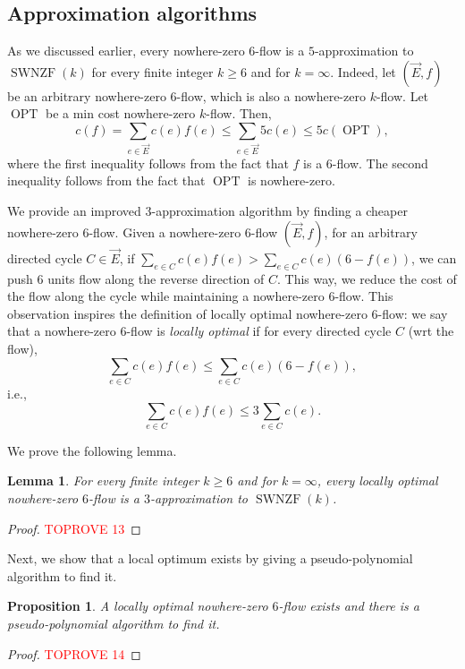 \documentclass[11pt]{article}
\newtheorem{lemma}[theorem]{Lemma}
\newtheorem{prop}[theorem]{Proposition}
\DeclareMathOperator{\opt}{OPT}
\begin{document}
\subsection{Approximation algorithms}\label{sec:SWNZF-approx}
As we discussed earlier, every nowhere-zero $6$-flow is a $5$-approximation to $\operatorname{SWNZF}(k)$ for every finite integer $k\geq 6$ and for $k=\infty$.  Indeed, let $(\vec{E},f)$ be an arbitrary nowhere-zero $6$-flow, which is also a nowhere-zero $k$-flow. Let $\opt$ be a min cost nowhere-zero $k$-flow. Then,
\[
c(f)=\sum_{e\in\vec{E}} c(e)f(e)\leq \sum_{e\in\vec{E}} 5c(e)\leq 5c(\opt),
\]
where the first inequality follows from the fact that $f$ is a $6$-flow. The second inequality follows from the fact that $\opt$ is nowhere-zero.

We provide an improved $3$-approximation algorithm by finding a cheaper nowhere-zero $6$-flow. Given a nowhere-zero $6$-flow $(\vec{E},f)$, for an arbitrary directed cycle $C\in\vec{E}$, if $\sum_{e\in C} c(e)f(e)>\sum_{e\in C} c(e)(6-f(e))$, we can push $6$ units flow along the reverse direction of $C$. This way, we reduce the cost of the flow along the cycle while maintaining a nowhere-zero $6$-flow. This observation inspires the definition of locally optimal nowhere-zero $6$-flow: we say that a nowhere-zero $6$-flow is \emph{locally optimal} if for every directed cycle $C$ (wrt the flow),
\[
    \sum_{e\in C} c(e)f(e)\leq \sum_{e\in C} c(e)(6-f(e)),
\]
i.e.,
\begin{equation}\label{eq:local-opt}
    \sum_{e\in C} c(e)f(e)\leq 3\sum_{e\in C} c(e).
\end{equation}

We prove the following lemma.

\begin{lemma}\label{lemma:localopt}
    For every finite integer $k\geq 6$ and for $k=\infty$, every locally optimal nowhere-zero $6$-flow is a $3$-approximation to $\operatorname{SWNZF}(k)$.
\end{lemma}
\begin{proof}\textcolor{red}{TOPROVE 13}\end{proof}

Next, we show that a local optimum exists by giving a pseudo-polynomial algorithm to find it. 
\begin{prop}
\label{prop:local}
    A locally optimal nowhere-zero $6$-flow exists and there is a pseudo-polynomial algorithm to find it.
\end{prop}
\begin{proof}\textcolor{red}{TOPROVE 14}\end{proof}
\end{document}
